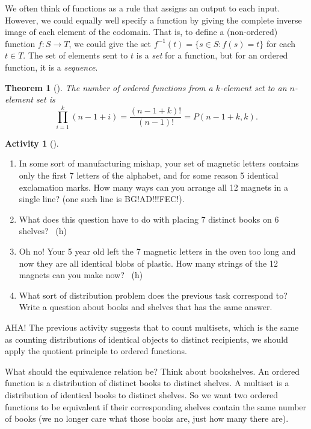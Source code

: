 \documentclass[10pt,]{book}
\theoremstyle{plain}
\newtheorem{theorem}{Theorem}[section]
\theoremstyle{definition}
\theoremstyle{definition}
\theoremstyle{definition}
\newtheorem{activity}[project]{Activity}
\numberwithin{equation}{chapter}
\def\inv{^{-1}}
\def\st{:}
\begin{document}
\par
\hypertarget{p-841}{}%
We often think of functions as a rule that assigns an output to each input.  However, we could equally well specify a function by giving the complete inverse image of each element of the codomain.  That is, to define a (non-ordered) function \(f:S \to T\), we could give the set \(f\inv(t) = \{s \in S \st f(s) = t\}\) for each \(t \in T\).  The set of elements sent to \(t\) is a \emph{set} for a function, but for an ordered function, it is a \emph{sequence}.%
\begin{theorem}[{}]\label{theorem-12}
\hypertarget{p-842}{}%
The number of ordered functions from a \(k\)-element set to an \(n\)-element set is%
\begin{equation*}
\prod_{i=1}^k (n-1+i) = \frac{(n-1+k)!}{(n-1)!} = P(n-1+k, k).
\end{equation*}
%
\end{theorem}
\begin{activity}[]\label{activity-118}
\leavevmode%
\begin{enumerate}[font=\bfseries,label=(\alph*),ref=\alph*]
\item\label{task-167} \hypertarget{p-843}{}%
In some sort of manufacturing mishap, your set of magnetic letters contains only the first 7 letters of the alphabet, and for some reason 5 identical exclamation marks.  How many ways can you arrange all 12 magnets in a single line?  (one such line is BG!AD!!!FEC!).%
\item\label{task-168} \hypertarget{p-844}{}%
What does this question have to do with placing \(7\) distinct books on \(6\) shelves?%
~{\tiny (h)}\item\label{task-169} \hypertarget{p-846}{}%
Oh no! Your 5 year old left the 7 magnetic letters in the oven too long and now they are all identical blobs of plastic.  How many strings of the 12 magnets can you make now?%
~{\tiny (h)}\item\label{task-170} \hypertarget{p-848}{}%
What sort of distribution problem does the previous task correspond to?  Write a question about books and shelves that has the same answer.%
\end{enumerate}
\end{activity}
\hypertarget{p-849}{}%
AHA!  The previous activity suggests that to count multisets, which is the same as counting distributions of identical objects to distinct recipients, we should apply the quotient principle to ordered functions.%
\par
\hypertarget{p-850}{}%
What should the equivalence relation be?  Think about bookshelves.  An ordered function is a distribution of distinct books to distinct shelves.  A multiset is a distribution of identical books to distinct shelves.  So we want two ordered functions to be equivalent if their corresponding shelves contain the same number of books (we no longer care what those books are, just how many there are).%
\end{document}
